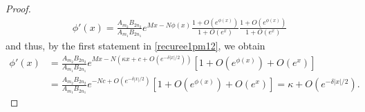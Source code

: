 \documentclass[10pt,a4paper]{amsart}
\begin{document}
\begin{proof}
\begin{equation*}
\begin{split}
\phi'(x)=\frac{A_{m_2}B_{2n_2}}{A_{m_1}B_{2n_1}}e^{Mx-N\phi(x)}\frac{1+O(e^{\phi(x)})}{1+O(e^{x})}\frac{1+O(e^{\phi(x)})}{1+O(e^{x})}
\end{split}
\end{equation*}
and thus, by the first statement in \eqref{recuree1pm12}, we obtain
\begin{equation*}%
\begin{split}
\phi'(x)&=\frac{A_{m_2}B_{2n_2}}{A_{m_1}B_{2n_1}}e^{Mx-N(\kappa x+c+O(e^{-\delta|x|/2}))}\left[1+O(e^{\phi(x)})+O(e^{x})\right]\\
&=\frac{A_{m_2}B_{2n_2}}{A_{m_1}B_{2n_1}}e^{-Nc+O(e^{-\delta|x|/2})}\left[1+O(e^{\phi(x)})+O(e^{x})\right]=\kappa+O(e^{-\delta|x|/2}).
\end{split}
\end{equation*}

\end{proof}
\end{document}
